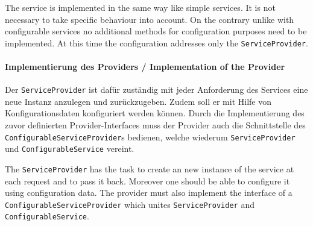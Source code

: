 \documentclass[10pt,a4paper]{scrartcl}
\providecommand{\deng}[2]{#1 / {\sffamily #2}}
\providecommand{\deutsch}[1]{#1}
\providecommand{\englisch}[1]{{\sffamily #1}}
\begin{document}
\englisch{The service is implemented in the same way like simple services. It is
not necessary to take specific behaviour into account. On the contrary unlike 
with configurable services no additional methods for configuration purposes need
to be implemented. At this time the configuration addresses only the 
\texttt{ServiceProvider}.}

\paragraph{\deng{Implementierung des Providers}{Implementation of the Provider}}
\deutsch{Der \texttt{ServiceProvider} ist dafür zuständig mit jeder Anforderung
des Services eine neue Instanz anzulegen und zurückzugeben. Zudem soll er mit
Hilfe von Konfigurationsdaten konfiguriert werden können. Durch die
Implementierung des zuvor definierten Provider-Interfaces muss der Provider auch
die Schnittstelle des \texttt{ConfigurableServiceProvider}s bedienen, welche
wiederum \texttt{ServiceProvider} und \texttt{ConfigurableService} vereint.}

\englisch{The \texttt{ServiceProvider} has the task to create an new instance of
the service at each request and to pass it back. Moreover one should be able to
configure it using configuration data. The provider must also implement the
interface of a \texttt{ConfigurableServiceProvider} which unites
\texttt{ServiceProvider} and \texttt{ConfigurableService}.}
\end{document}
